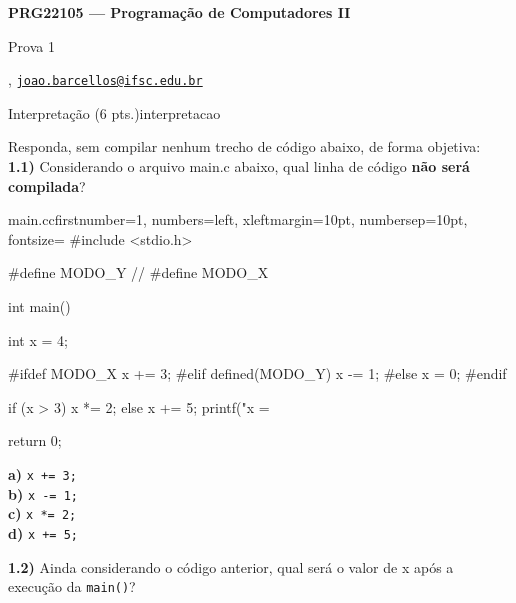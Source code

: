 





\begin{Large}
    \textbf{PRG22105 --- Programação de Computadores II}
    
    Prova 1 \hfill {}
\end{Large}

\vspace{1ex}
\textbf{} , \href{mailto:joao.barcellos@ifsc.edu.br}{\texttt{joao.barcellos@ifsc.edu.br}}\\
\textbf{}


\vspace{2ex}

\begin{problem}{Interpretação (6 pts.)}{interpretacao}

Responda, sem compilar nenhum trecho de código abaixo, de forma objetiva:\\

\textbf{1.1)} Considerando o arquivo main.c abaixo, qual linha de código \textbf{não será compilada}?

\begin{mylisting}[enhanced]{main.c}{c}{firstnumber=1, numbers=left, xleftmargin=10pt, numbersep=10pt, fontsize=\small}
#include <stdio.h>

#define MODO_Y
// #define MODO_X

int main() {
    int x = 4;

    #ifdef MODO_X
        x += 3;
    #elif defined(MODO_Y)
        x -= 1;
    #else
        x = 0;
    #endif

    if (x > 3)
        x *= 2;
    else
        x += 5;
    printf("x = %

    return 0;   
}
\end{mylisting}

\textbf{a)} \texttt{x += 3;}\\
\textbf{b)} \texttt{x -= 1;}\\
\textbf{c)} \texttt{x *= 2;}\\
\textbf{d)} \texttt{x += 5;}\\

\vspace{0.5em}

\textbf{1.2)} Ainda considerando o código anterior, qual será o valor de x após a execução da \texttt{main()}?


\end{problem}
